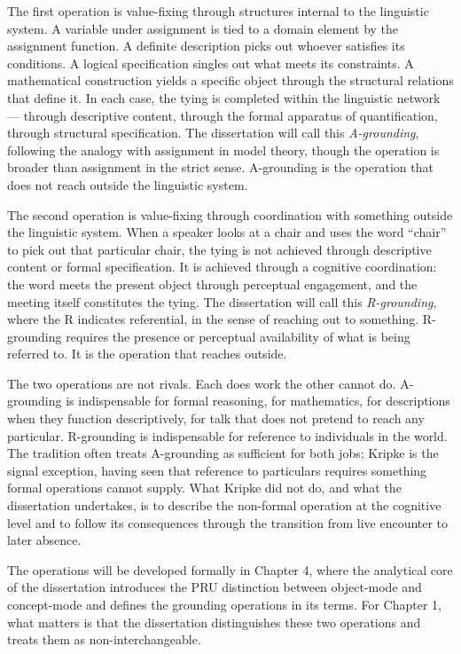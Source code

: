\documentclass[10pt]{article}
\begin{document}
The first operation is value-fixing through structures internal to the linguistic system. A variable under assignment is tied to a domain element by the assignment function. A definite description picks out whoever satisfies its conditions. A logical specification singles out what meets its constraints. A mathematical construction yields a specific object through the structural relations that define it. In each case, the tying is completed within the linguistic network --- through descriptive content, through the formal apparatus of quantification, through structural specification. The dissertation will call this \emph{A-grounding}, following the analogy with assignment in model theory, though the operation is broader than assignment in the strict sense. A-grounding is the operation that does not reach outside the linguistic system.

The second operation is value-fixing through coordination with something outside the linguistic system. When a speaker looks at a chair and uses the word ``chair'' to pick out that particular chair, the tying is not achieved through descriptive content or formal specification. It is achieved through a cognitive coordination: the word meets the present object through perceptual engagement, and the meeting itself constitutes the tying. The dissertation will call this \emph{R-grounding}, where the R indicates referential, in the sense of reaching out to something. R-grounding requires the presence or perceptual availability of what is being referred to. It is the operation that reaches outside.

The two operations are not rivals. Each does work the other cannot do. A-grounding is indispensable for formal reasoning, for mathematics, for descriptions when they function descriptively, for talk that does not pretend to reach any particular. R-grounding is indispensable for reference to individuals in the world. The tradition often treats A-grounding as sufficient for both jobs; Kripke is the signal exception, having seen that reference to particulars requires something formal operations cannot supply. What Kripke did not do, and what the dissertation undertakes, is to describe the non-formal operation at the cognitive level and to follow its consequences through the transition from live encounter to later absence.

The operations will be developed formally in Chapter 4, where the analytical core of the dissertation introduces the PRU distinction between object-mode and concept-mode and defines the grounding operations in its terms. For Chapter 1, what matters is that the dissertation distinguishes these two operations and treats them as non-interchangeable.
\end{document}
